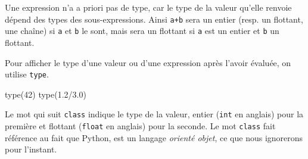 Une expression n'a a priori pas de type, car le type de la valeur qu'elle renvoie dépend des types 
des sous-expressions. Ainsi \texttt{a+b} sera un entier (resp. un flottant, une chaîne) si 
\texttt{a} et \texttt{b} le sont, mais sera un flottant si \texttt{a} est un entier et \texttt{b} 
un flottant.


\begin{xxpyconsole}%
Pour afficher le type d'une valeur ou d'une expression après l'avoir évaluée, on utilise 
\texttt{type}.
\begin{pyconsole}
type(42)
type(1.2/3.0)
\end{pyconsole}
Le mot qui suit \texttt{class} indique le type de la valeur, entier (\texttt{int} en anglais) pour 
la première et flottant (\texttt{float} en anglais) pour la seconde. Le mot \texttt{class} fait 
référence au fait que Python, est un langage \emph{orienté objet}, ce que nous ignorerons pour 
l'instant.\\
\end{xxpyconsole}





